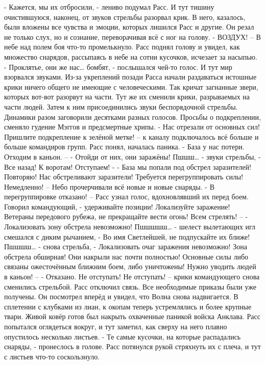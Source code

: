 \documentclass[a4paper, 12pt]{report}
\begin{document}
	- Кажется, мы их отбросили, - лениво подумал Расс. 
И тут тишину очистившуюся, наконец, от звуков стрельбы разорвал крик. В него, казалось, были вложены все чувства и эмоции, которых лишился Расс и другие. Он резал не только слух, но и сознание, переворачивая всё с ног на голову.
	- ВОЗДУХ! –
	В небе над полем боя что-то промелькнуло. Расс поднял голову и увидел, как множество снарядов, рассыпаясь в небе на сотни кусочков, исчезает за насыпью.
	- Проклятье, они же нас… бомбят, - послышался чей-то голос.
	И тут мир взорвался звуками. Из-за укреплений позади Расса начали раздаваться истошные крики ничего общего не имеющие с человеческими. Так кричат загнанные звери, которых вот-вот разорвут на части. Тут же их сменили крики, разрываемых на части людей. Затем к ним присоединились звуки беспорядочной стрельбы.
	Динамики разом заговорили десятками разных голосов. Просьбы о подкреплении, сменяло гудение Мэггов и предсмертные хрипы.
	- Нас отрезали от основных сил! Пришлите подкрепление к зелёной метке! – к каналу подключалось всё больше и больше командиров групп. Расс понял, началась паника.
	- База у нас потери. Отходим в каньон. –
	- Отойди от них, они заражёны! Пшшш… - звуки стрельбы, - Все назад! К воротам! Отступаем! -
	- База мы попали под обстрел заразителей! Повторяю! Нас обстреливают заразители! Требуется перегруппировать силы! Немедленно! –
	Небо прочерчивали всё новые и новые снаряды.
	- В перегруппировке отказано! – Расс узнал голос, вдохновлявший их перед боем. Говорил командующий, - удерживайте позиции! Локализуйте заражение! Ветераны передового рубежа, не прекращайте вести огонь! Всем стрелять! – 
	- Локализовать зону обстрела невозможно! Пшшшшш… - шелест вылетающих игл смешался с диким рычанием, - Во имя Светлейшей, не подпускайте их ближе! Пшшшш… - снова стрельба, - Локализовать очаг заражения невозможно! Зона обстрела обширная! Они накрыли нас почти полностью! Основные силы либо связаны ожесточённым ближним боем, либо уничтожены! Нужно уводить людей в каньон! –
	- Отказано. Не отступать! Не отступать! – крики командующего снова сменились стрельбой. Расс отключил связь. Все необходимые приказы были уже получены.
	Он посмотрел вперёд и увидел, что Волна снова надвигается. В сплетении с клубками из лиан, к окопам теперь устремлялись и более крупные твари. Живой ковёр готов был накрыть охваченные паникой войска Анклава. Расс попытался оглядеться вокруг, и тут заметил, как сверху на него плавно опустилось несколько листьев.
	- Те самые кусочки, на которые распадались снаряды, - пронеслось в голове.
	Расс потянулся рукой стряхнуть их с плеча, и тут с листьев что-то соскользнуло.
\end{document}

